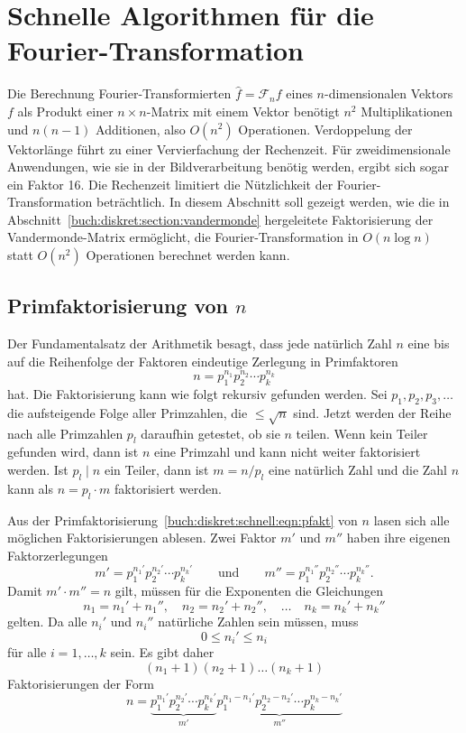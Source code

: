 %
%
%
\section{Schnelle Algorithmen für die Fourier-Transformation
\label{buch:diskret:section:schnell}}
Die Berechnung Fourier-Transformierten $\hat{f}=\mathscr{F}_nf$ eines
$n$-dimensionalen Vektors $f$ als Produkt einer $n\times n$-Matrix mit
einem Vektor benötigt $n^2$ Multiplikationen und $n(n-1)$ Additionen,
also $O(n^2)$ Operationen.
Verdoppelung der Vektorlänge führt zu einer Vervierfachung der Rechenzeit.
Für zweidimensionale Anwendungen, wie sie in der Bildverarbeitung
benötig werden, ergibt sich sogar ein Faktor 16.
Die Rechenzeit limitiert die Nützlichkeit der Fourier-Transformation
beträchtlich.
In diesem Abschnitt soll gezeigt werden, wie die in
Abschnitt~\ref{buch:diskret:section:vandermonde} hergeleitete
Faktorisierung der Vandermonde-Matrix ermöglicht, die Fourier-Transformation
in $O(n\log n)$ statt $O(n^2)$ Operationen berechnet werden kann.

%
%
\subsection{Primfaktorisierung von $n$
\label{buch:diskret:schnell:subsection:primfaktorisierung}}
Der Fundamentalsatz der Arithmetik besagt, dass jede natürlich Zahl $n$
eine bis auf die Reihenfolge der Faktoren eindeutige Zerlegung in
Primfaktoren
\begin{equation}
n = p_1^{n_1} p_2^{n_2} \cdots p_k^{n_k}
\label{buch:diskret:schnell:eqn:pfakt}
\end{equation}
hat.
Die Faktorisierung kann wie folgt rekursiv gefunden werden.
Sei $p_1,p_2,p_3,\dots$ die aufsteigende Folge aller Primzahlen, die
$\le \sqrt{n}$ sind.
Jetzt werden der Reihe nach alle Primzahlen $p_l$ daraufhin getestet,
ob sie $n$ teilen.
Wenn kein Teiler gefunden wird, dann ist $n$ eine Primzahl und kann
nicht weiter faktorisiert werden.
Ist $p_l\mid n$ ein Teiler, dann ist $m=n/p_l$ eine natürlich Zahl
und die Zahl $n$ kann als $n=p_l\cdot m$ faktorisiert werden.

Aus der Primfaktorisierung~\eqref{buch:diskret:schnell:eqn:pfakt}
von $n$ lasen sich alle möglichen Faktorisierungen ablesen.
Zwei Faktor $m'$ und $m''$ haben ihre eigenen Faktorzerlegungen
\[
m'= p_1^{n_1'}p_2^{n_2'}\cdots p_k^{n_k'}
\qquad\text{und}\qquad
m''= p_1^{n_1''}p_2^{n_2''}\cdots p_k^{n_k''}.
\]
Damit $m'\cdot m''=n$ gilt, müssen für die Exponenten die Gleichungen
\[
n_1=n_1'+n_1'',\quad
n_2=n_2'+n_2'',\quad\dots\quad
n_k=n_k'+n_k''
\]
gelten.
Da alle $n_i'$ und $n_i''$ natürliche Zahlen sein müssen, muss
\[
0\le n_i'\le n_i
\]
für alle $i=1,\dots,k$ sein.
Es gibt daher
\[
(n_1+1)(n_2+1)\dots(n_k+1)
\]
Faktorisierungen der Form
\[
n
=
\underbrace{
p_1^{n_1'}p_2^{n_2'}\cdots p_k^{n_k'}
}_{\displaystyle m'}
\underbrace{
p_1^{n_1-n_1'}p_2^{n_2-n_2'}\cdots p_k^{n_k-n_k'}
}_{\displaystyle m''}
\]

